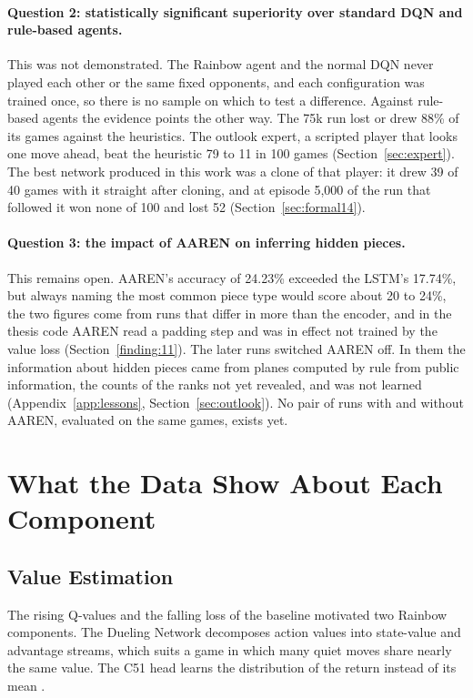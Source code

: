 \paragraph{Question 2: statistically significant superiority over standard DQN and rule-based agents.} This was not demonstrated. The Rainbow agent and the normal DQN never played each other or the same fixed opponents, and each configuration was trained once, so there is no sample on which to test a difference. Against rule-based agents the evidence points the other way. The 75k run lost or drew 88\% of its games against the heuristics. The outlook expert, a scripted player that looks one move ahead, beat the heuristic 79 to 11 in 100 games (Section~\ref{sec:expert}). The best network produced in this work was a clone of that player: it drew 39 of 40 games with it straight after cloning, and at episode 5,000 of the run that followed it won none of 100 and lost 52 (Section~\ref{sec:formal14}).

\paragraph{Question 3: the impact of AAREN on inferring hidden pieces.} This remains open. AAREN's accuracy of 24.23\% exceeded the LSTM's 17.74\%, but always naming the most common piece type would score about 20 to 24\%, the two figures come from runs that differ in more than the encoder, and in the thesis code AAREN read a padding step and was in effect not trained by the value loss (Section~\ref{finding:11}). The later runs switched AAREN off. In them the information about hidden pieces came from planes computed by rule from public information, the counts of the ranks not yet revealed, and was not learned (Appendix~\ref{app:lessons}, Section~\ref{sec:outlook}). No pair of runs with and without AAREN, evaluated on the same games, exists yet.

\section{What the Data Show About Each Component}

\subsection{Value Estimation}

The rising Q-values and the falling loss of the baseline motivated two Rainbow components. The Dueling Network decomposes action values into state-value and advantage streams, which suits a game in which many quiet moves share nearly the same value. The C51 head learns the distribution of the return instead of its mean \cite{C51}.

